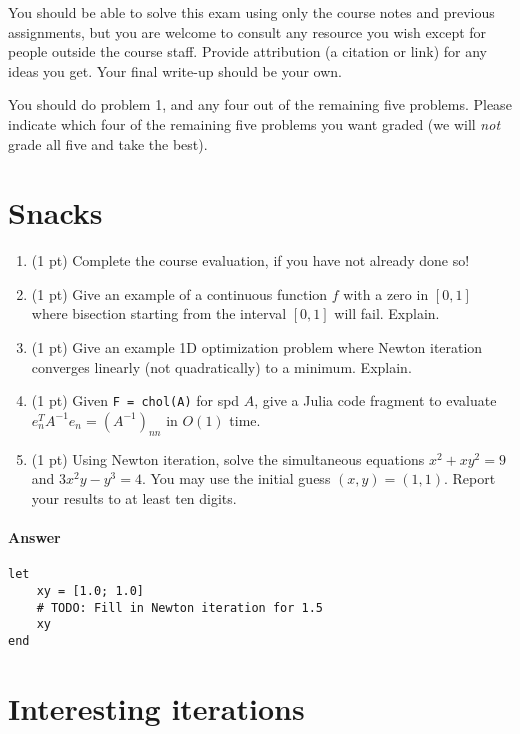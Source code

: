 \documentclass[12pt, leqno]{article} %
\providecommand{\tightlist}{%
  \setlength{\itemsep}{0pt}\setlength{\parskip}{0pt}}
\begin{document}

You should be able to solve this exam using only the course notes and
previous assignments, but you are welcome to consult any resource you
wish except for people outside the course staff. Provide attribution (a
citation or link) for any ideas you get. Your final write-up should be
your own.

You should do problem 1, and any four out of the remaining five
problems. Please indicate which four of the remaining five problems you
want graded (we will \emph{not} grade all five and take the best).

\section{Snacks}

\begin{enumerate}
\def\labelenumi{\arabic{enumi}.}
\tightlist
\item
  (1 pt) Complete the course evaluation, if you have not already done
  so!
\item
  (1 pt) Give an example of a continuous function \(f\) with a zero in
  \([0,1]\) where bisection starting from the interval \([0,1]\) will
  fail. Explain.
\item
  (1 pt) Give an example 1D optimization problem where Newton iteration
  converges linearly (not quadratically) to a minimum. Explain.
\item
  (1 pt) Given \texttt{F\ =\ chol(A)} for spd \(A\), give a Julia code
  fragment to evaluate \(e_n^T A^{-1} e_n = (A^{-1})_{nn}\) in \(O(1)\)
  time.
\item
  (1 pt) Using Newton iteration, solve the simultaneous equations
  \(x^2 + xy^2 = 9\) and \(3x^2 y - y^3 = 4\). You may use the initial
  guess \((x,y) = (1,1)\). Report your results to at least ten digits.
\end{enumerate}

\paragraph{Answer}

\begin{verbatim}
let
    xy = [1.0; 1.0]
    # TODO: Fill in Newton iteration for 1.5
    xy
end
\end{verbatim}

\section{Interesting iterations}
\end{document}
